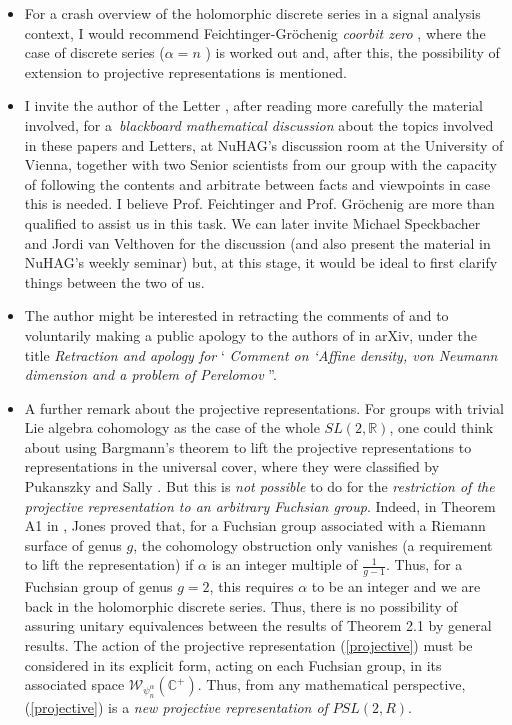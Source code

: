 \documentclass[11pt,reqno]{amsart}
\numberwithin{equation}{section}
\theoremstyle{plain}
\theoremstyle{definition}
\theoremstyle{remark}
\begin{document}
\begin{itemize}
\item For a crash overview of the holomorphic discrete series in a signal
analysis context, I would recommend Feichtinger-Gr\"{o}chenig \emph{coorbit
zero} \cite[Example 7.3]{FG}, where the case of discrete series ($\alpha =n$%
) is worked out and, after this, the possibility of extension to projective
representations is mentioned.

\item I invite the author of the Letter \cite{Letter}, after reading more
carefully the material involved, for a\emph{\ }\textsl{blackboard
mathematical discussion} about the topics involved in these papers and
Letters, at NuHAG's discussion room at the University of Vienna, together
with two Senior scientists from our group with the capacity of following the
contents and arbitrate between facts and viewpoints in case this is needed.
I believe Prof. Feichtinger and Prof. Gr\"{o}chenig are more than qualified
to assist us in this task. We can later invite Michael Speckbacher and Jordi
van Velthoven for the discussion (and also present the material in NuHAG's
weekly seminar) but, at this stage, it would be ideal to first clarify
things between the two of us.

\item The author might be interested in retracting the comments of \cite%
{Letter} and to voluntarily making a public apology to the authors of \cite%
{Affine} in arXiv, under the title \emph{Retraction and apology for }`\emph{%
Comment on `Affine density, von Neumann dimension and a problem of Perelomov}%
\textquotedblright .

\item A further remark about the projective representations. For groups with
trivial Lie algebra cohomology as the case of the whole $SL(2,\mathbb{R})$,
one could think about using Bargmann's theorem \cite{Bar1} to lift the
projective representations to representations in the universal cover, where
they were classified by Pukanszky \cite{Puk} and Sally \cite{Sally}. But
this is \emph{not possible} to do for the \emph{restriction of the
projective representation to an arbitrary Fuchsian group}. Indeed, in
Theorem A1 in \cite[Appendix A]{Jones}, Jones proved that, for a Fuchsian
group associated with a Riemann surface of genus $g$, the cohomology
obstruction only vanishes (a requirement to lift the representation) if $%
\alpha $ is an integer multiple of $\frac{1}{g-1}$. Thus, for a Fuchsian
group of genus $g=2$, this requires $\alpha $ to be an integer and we are
back in the holomorphic discrete series. Thus, there is no possibility of
assuring unitary equivalences between the results of Theorem 2.1 by general
results. The action of the projective representation (\ref{projective}) must
be considered in its explicit form, acting on each Fuchsian group, in its
associated space $\mathcal{W}_{\psi _{n}^{\alpha }}(\mathbb{C}^{+})$. Thus,
from any mathematical perspective, (\ref{projective}) is a \emph{new
projective representation of }$PSL(2,R)$.
\end{itemize}
\end{document}
